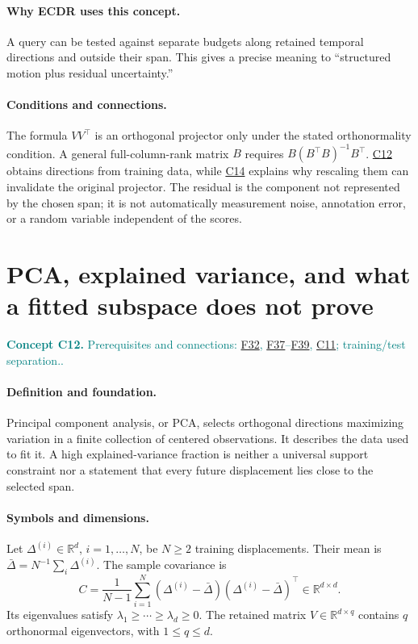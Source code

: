 \documentclass[11pt,a4paper]{article}
\newcommand{\R}{\mathbb R}
\newcommand{\conceptid}{Front matter}
\newcommand{\concept}[3]{\clearpage\renewcommand{\conceptid}{#1}%
\section{#2}\label{concept:#1}%
\textcolor{teal}{\textbf{Concept #1.} Prerequisites and connections: #3.}\par
\typeout{ECDR-CONCEPT-START #1 PAGE=\thepage}}
\begin{document}
\paragraph{Why ECDR uses this concept.}
A query can be tested against separate budgets along retained temporal directions and outside their span. This gives a precise meaning to ``structured motion plus residual uncertainty.''
\paragraph{Conditions and connections.}
The formula $VV^\top$ is an orthogonal projector only under the stated orthonormality condition. A general full-column-rank matrix $B$ requires $B(B^\top B)^{-1}B^\top$. \hyperref[concept:C12]{C12} obtains directions from training data, while \hyperref[concept:C14]{C14} explains why rescaling them can invalidate the original projector. The residual is the component not represented by the chosen span; it is not automatically measurement noise, annotation error, or a random variable independent of the scores.
\par\label{endconcept:C11}

\concept{C12}{PCA, explained variance, and what a fitted subspace does not prove}{\hyperref[concept:F32]{F32}, \hyperref[concept:F37]{F37}--\hyperref[concept:F39]{F39}, \hyperref[concept:C11]{C11}; training/test separation.}
\paragraph{Definition and foundation.}
Principal component analysis, or PCA, selects orthogonal directions maximizing variation in a finite collection of centered observations. It describes the data used to fit it. A high explained-variance fraction is neither a universal support constraint nor a statement that every future displacement lies close to the selected span.
\paragraph{Symbols and dimensions.}
Let $\Delta^{(i)}\in\R^d$, $i=1,\ldots,N$, be $N\ge2$ training displacements. Their mean is $\bar\Delta=N^{-1}\sum_i\Delta^{(i)}$. The sample covariance is
\[
 C=\frac1{N-1}\sum_{i=1}^{N}(\Delta^{(i)}-\bar\Delta)
 (\Delta^{(i)}-\bar\Delta)^\top\in\R^{d\times d}.
\]
Its eigenvalues satisfy $\lambda_1\ge\cdots\ge\lambda_d\ge0$. The retained matrix $V\in\R^{d\times q}$ contains $q$ orthonormal eigenvectors, with $1\le q\le d$.
\end{document}
